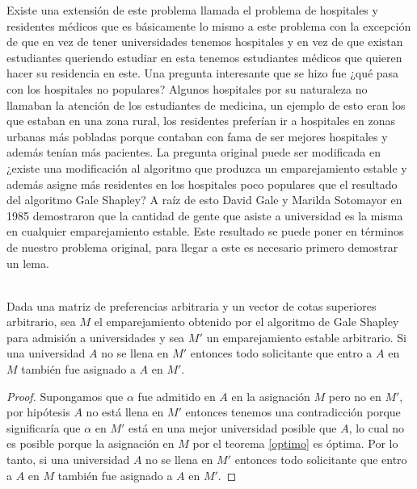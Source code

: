 Existe una extensión de este problema llamada el problema de hospitales y residentes médicos que es básicamente lo mismo a este problema con la excepción de que en vez de tener universidades tenemos hospitales y en vez de que existan estudiantes queriendo estudiar en esta tenemos estudiantes médicos que quieren hacer su residencia en este. Una pregunta interesante que se hizo fue ¿qué pasa con los hospitales no populares? Algunos hospitales por su naturaleza no llamaban la atención de los estudiantes de medicina, un ejemplo de esto eran los que estaban en una zona rural, los residentes preferían ir a hospitales en zonas urbanas más pobladas porque contaban con fama de ser mejores hospitales y además tenían más pacientes. La pregunta original puede ser modificada en ¿existe una modificación al algoritmo que produzca un emparejamiento estable y además asigne más residentes en los hospitales poco populares que el resultado del algoritmo Gale Shapley? A raíz de esto David Gale y Marilda Sotomayor en 1985 demostraron que la cantidad de gente que asiste a universidad es la misma en cualquier emparejamiento estable. Este resultado se puede poner en términos de nuestro problema original, para llegar a este es necesario primero demostrar un lema.

\begin{lem} 
\label{lema rural} 
\cite{Verde} \\
Dada una matriz de preferencias arbitraria y un vector de cotas superiores arbitrario, sea $M$ el emparejamiento obtenido por el algoritmo de Gale Shapley para admisión a universidades y sea $M'$ un emparejamiento estable arbitrario. Si una universidad $A$ no se llena en $M'$ entonces todo solicitante que entro a $A$ en $M$ también fue asignado a $A$ en $M'$. 
\end{lem}
\begin{proof}
Supongamos que $\alpha$ fue admitido en $A$ en la asignación $M$ pero no en $M'$, por hipótesis $A$ no está llena en $M'$ entonces tenemos una contradicción porque significaría que $\alpha$ en $M'$ está en una mejor universidad posible que $A$, lo cual no es posible porque la asignación en $M$ por el teorema \ref{optimo} es óptima. Por lo tanto, si una universidad $A$ no se llena en $M'$ entonces todo solicitante que entro a $A$ en $M$ también fue asignado a $A$ en $M'$. 
\end{proof}


